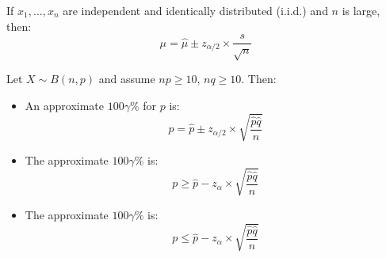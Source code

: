 \begin{multicols}{3}
      \par If $x_1, \ldots, x_n$ are independent and identically distributed (i.i.d.) and $n$ is large, then:
        \[
          \mu = \hat{\mu} \pm z_{\alpha / 2} \times \frac{s}{\sqrt{n}}
        \]

      \par Let $X \sim B(n, p)$ and assume $np \geq 10$, $nq \geq 10$. Then:
      \begin{itemize}
        \item An approximate $100\gamma\%$  for $p$ is:
          \[
            p = \hat{p} \pm z_{\alpha / 2} \times \sqrt{\frac{\hat{p} \hat{q}}{n}}
          \]
        \item The approximate $100\gamma\%$  is:
          \[
            p \geq \hat{p} - z_{\alpha} \times \sqrt{\frac{\hat{p} \hat{q}}{n}}
          \]
        \item The approximate $100\gamma\%$  is:
          \[
            p \leq \hat{p} - z_{\alpha} \times \sqrt{\frac{\hat{p} \hat{q}}{n}}
          \]
      \end{itemize}

\end{multicols}

\clearpage
